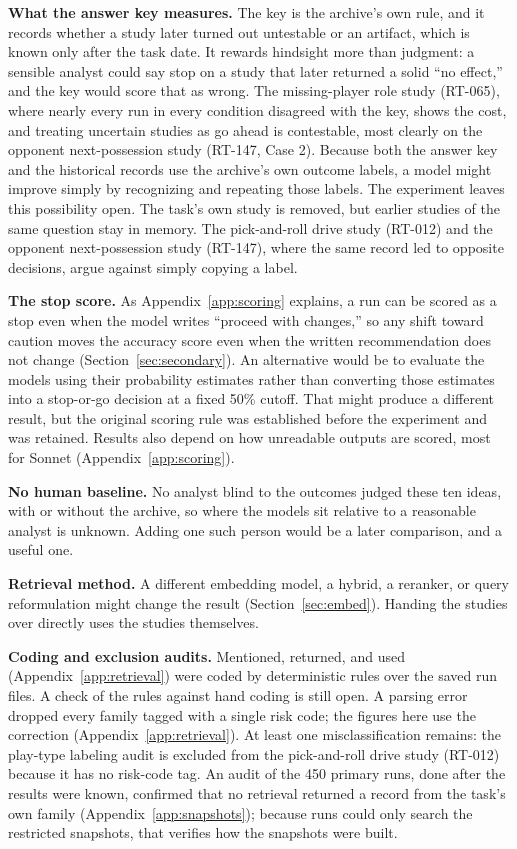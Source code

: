 \documentclass[11pt]{article}
\begin{document}
\textbf{What the answer key measures.} The key is the archive's own rule, and it records whether a study later turned out untestable or an artifact, which is known only after the task date. It rewards hindsight more than judgment: a sensible analyst could say stop on a study that later returned a solid ``no effect,'' and the key would score that as wrong. The missing-player role study (RT-065), where nearly every run in every condition disagreed with the key, shows the cost, and treating uncertain studies as go ahead is contestable, most clearly on the opponent next-possession study (RT-147, Case 2). Because both the answer key and the historical records use the archive's own outcome labels, a model might improve simply by recognizing and repeating those labels. The experiment leaves this possibility open. The task's own study is removed, but earlier studies of the same question stay in memory. The pick-and-roll drive study (RT-012) and the opponent next-possession study (RT-147), where the same record led to opposite decisions, argue against simply copying a label.

\textbf{The stop score.} As Appendix~\ref{app:scoring} explains, a run can be scored as a stop even when the model writes ``proceed with changes,'' so any shift toward caution moves the accuracy score even when the written recommendation does not change (Section~\ref{sec:secondary}). An alternative would be to evaluate the models using their probability estimates rather than converting those estimates into a stop-or-go decision at a fixed 50\% cutoff. That might produce a different result, but the original scoring rule was established before the experiment and was retained. Results also depend on how unreadable outputs are scored, most for Sonnet (Appendix~\ref{app:scoring}).

\textbf{No human baseline.} No analyst blind to the outcomes judged these ten ideas, with or without the archive, so where the models sit relative to a reasonable analyst is unknown. Adding one such person would be a later comparison, and a useful one.

\textbf{Retrieval method.} A different embedding model, a hybrid, a reranker, or query reformulation might change the result (Section~\ref{sec:embed}). Handing the studies over directly uses the studies themselves.

\textbf{Coding and exclusion audits.} Mentioned, returned, and used (Appendix~\ref{app:retrieval}) were coded by deterministic rules over the saved run files. A check of the rules against hand coding is still open. A parsing error dropped every family tagged with a single risk code; the figures here use the correction (Appendix~\ref{app:retrieval}). At least one misclassification remains: the play-type labeling audit is excluded from the pick-and-roll drive study (RT-012) because it has no risk-code tag. An audit of the 450 primary runs, done after the results were known, confirmed that no retrieval returned a record from the task's own family (Appendix~\ref{app:snapshots}); because runs could only search the restricted snapshots, that verifies how the snapshots were built.
\end{document}
